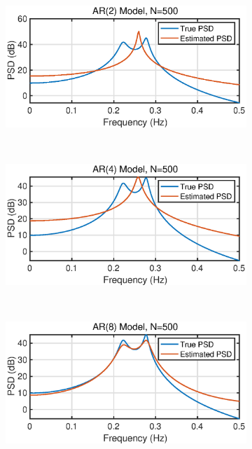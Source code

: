 \begin{figure}[htbp]
     \centering
     \begin{subfigure}[b]{0.35\textwidth}
         \centering
         \includegraphics[width=\textwidth]{fig/14/14b1.eps}
     \end{subfigure}
     ~
     \begin{subfigure}[b]{0.35\textwidth}
         \centering
         \includegraphics[width=\textwidth]{fig/14/14b2.eps}
     \end{subfigure}
     ~
     \begin{subfigure}[b]{0.35\textwidth}
         \centering
         \includegraphics[width=\textwidth]{fig/14/14b3.eps}

\end{subfigure}
\end{figure}
